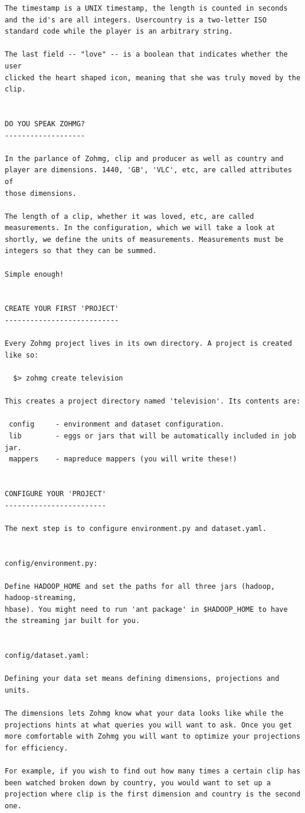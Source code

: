 \begin{verbatim}
The timestamp is a UNIX timestamp, the length is counted in seconds
and the id's are all integers. Usercountry is a two-letter ISO
standard code while the player is an arbitrary string.

The last field -- "love" -- is a boolean that indicates whether the user
clicked the heart shaped icon, meaning that she was truly moved by the
clip.


DO YOU SPEAK ZOHMG?
-------------------

In the parlance of Zohmg, clip and producer as well as country and
player are dimensions. 1440, 'GB', 'VLC', etc, are called attributes of
those dimensions.

The length of a clip, whether it was loved, etc, are called
measurements. In the configuration, which we will take a look at
shortly, we define the units of measurements. Measurements must be
integers so that they can be summed.

Simple enough!


CREATE YOUR FIRST 'PROJECT'
---------------------------

Every Zohmg project lives in its own directory. A project is created
like so:

  $> zohmg create television

This creates a project directory named 'television'. Its contents are:

 config     - environment and dataset configuration.
 lib        - eggs or jars that will be automatically included in job jar.
 mappers    - mapreduce mappers (you will write these!)


CONFIGURE YOUR 'PROJECT'
------------------------

The next step is to configure environment.py and dataset.yaml.


config/environment.py:

Define HADOOP_HOME and set the paths for all three jars (hadoop, hadoop-streaming,
hbase). You might need to run 'ant package' in $HADOOP_HOME to have
the streaming jar built for you.


config/dataset.yaml:

Defining your data set means defining dimensions, projections and
units.

The dimensions lets Zohmg know what your data looks like while the
projections hints at what queries you will want to ask. Once you get
more comfortable with Zohmg you will want to optimize your projections
for efficiency.

For example, if you wish to find out how many times a certain clip has
been watched broken down by country, you would want to set up a
projection where clip is the first dimension and country is the second
one.


\end{verbatim}
